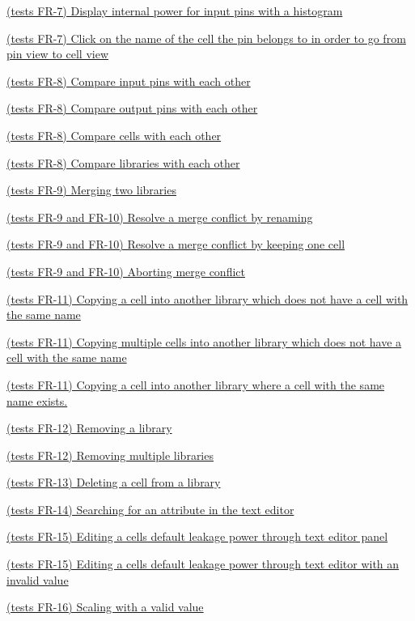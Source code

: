 \documentclass[10pt,a4paper]{report}
\newcommand{\refer}[2]{\hyperref[#1]{\textcolor{col:reference}{#2}}}
\begin{document}
\begin{GTC}
    \item \refer{GTC-21} {(tests FR-7) Display internal power for input pins with a histogram}
    \item \refer{GTC-22} {(tests FR-7) Click on the name of the cell the pin belongs to in order to go from pin view to cell view}
    \item  \refer{GTC-23} {(tests FR-8) Compare input pins with each other}
    \item  \refer{GTC-24} {(tests FR-8) Compare output pins with each other}
    \item  \refer{GTC-25} {(tests FR-8) Compare cells with each other}
    \item  \refer{GTC-26} {(tests FR-8) Compare libraries with each other}
    \item  \refer{GTC-27} {(tests FR-9) Merging two libraries}
    \item  \refer{GTC-28} {(tests FR-9 and FR-10) Resolve a merge conflict by renaming}
     \item  \refer{GTC-29} {(tests FR-9 and FR-10) Resolve a merge conflict by keeping one cell}
    \item  \refer{GTC-30} {(tests FR-9 and FR-10) Aborting merge conflict}
    \item  \refer{GTC-31} {(tests FR-11) Copying a cell into another library which does not have a cell with the same name}
    \item  \refer{GTC-32} {(tests FR-11) Copying multiple cells into another library which does not have a cell with the same name}
    \item  \refer{GTC-33} {(tests FR-11) Copying a cell into another library where a cell with the same name exists.}
    \item  \refer{GTC-34} {(tests FR-12) Removing a library}
    \item  \refer{GTC-35} {(tests FR-12) Removing multiple libraries}
    \item  \refer{GTC-36} {(tests FR-13) Deleting a cell from a library}
    \item  \refer{GTC-37} {(tests FR-14) Searching for an attribute in the text editor}
    \item  \refer{GTC-38} {(tests FR-15) Editing a cells default leakage power through text editor panel}
    \item  \refer{GTC-39} {(tests FR-15) Editing a cells default leakage power through text editor with an invalid value}
    \item  \refer{GTC-40} {(tests FR-16) Scaling with a valid value}

\end{GTC}
\end{document}
